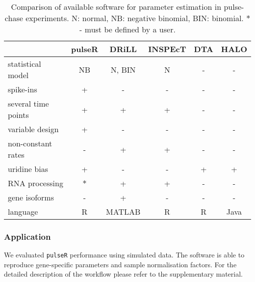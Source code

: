 \begin{table}
 \begin{tabular}{|l|c|c|c|c|c|}\hline
                        &pulseR &DRiLL          &INSPEcT&DTA    &HALO       \\\hline
 statistical model      & NB    &N, BIN         &N       & -    & -      \\\hline                         
 spike-ins              & +     &   -           &  -     &  -    & -         \\\hline               
 several time points    & +     &   +           &  +     &  -    & -         \\\hline                    
  variable design       & +     &   -           &  -     &  -    & -         \\\hline 
 non-constant rates     & -     &   +           &  +     &  -    & -         \\\hline 
            uridine bias& +     &   -           &  -     &  +    & +         \\\hline 
       RNA processing   &$\ast$ &   +           &  +     &  -    & -         \\\hline 
       gene isoforms    & -     &   +           &  -     &  -    & -         \\\hline 
  language              & R     &MATLAB         &  R     &  R    & Java      \\\hline 
 \end{tabular}
\caption{Comparison of available software for parameter estimation in 
pulse-chase experiments. N: normal, NB: negative binomial, BIN: binomial.
$\ast$ - must be defined by a user.
}
\end{table}

\subsubsection*{Application}
We evaluated \verb|pulseR| performance using simulated data. 
The software is able to reproduce gene-specific parameters and 
sample normalisation factors.
For the detailed
description of the workflow please refer to the supplementary material.

